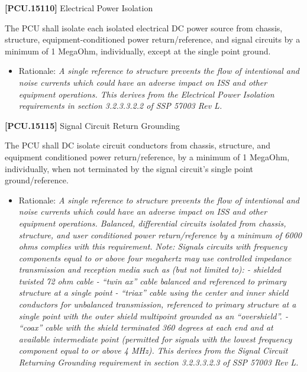 \documentclass[12pt,oneside,oldfontcommands]{memoir}
\begin{document}
\textbf{[PCU.15110]} Electrical Power Isolation

The \gls{PCU} shall isolate each isolated electrical DC power source from chassis, structure, equipment-conditioned power return\slash reference, and signal circuits by a minimum of 1 MegaOhm, individually, except at the single point ground.

\begin{itemize}
\item{} Rationale: \emph{A single reference to structure prevents the flow of intentional and noise currents which could have an adverse impact on ISS and other equipment operations. This derives from the Electrical Power Isolation requirements in section 3.2.3.3.2.2 of SSP 57003 Rev L.}

\end{itemize}

\textbf{[PCU.15115]} Signal Circuit Return Grounding

The \gls{PCU} shall DC isolate circuit conductors from chassis, structure, and equipment conditioned power return\slash reference, by a minimum of 1 MegaOhm, individually, when not terminated by the signal circuit's single point ground\slash reference.

\begin{itemize}
\item{} Rationale: \emph{A single reference to structure prevents the flow of intentional and noise currents which could have an adverse impact on ISS and other equipment operations. Balanced, differential circuits isolated from chassis, structure, and user conditioned power return\slash reference by a minimum of 6000 ohms complies with this requirement. Note: Signals circuits with frequency components equal to or above four megahertz may use controlled impedance transmission and reception media such as (but not limited to): - shielded twisted 72 ohm cable - ``twin ax'' cable balanced and referenced to primary structure at a single point - ``triax'' cable using the center and inner shield conductors for unbalanced transmission, referenced to primary structure at a single point with the outer shield multipoint grounded as an ``overshield''. - ``coax'' cable with the shield terminated 360 degrees at each end and at available intermediate point (permitted for signals with the lowest frequency component equal to or above 4 MHz). This derives from the Signal Circuit Returning Grounding requirement in section 3.2.3.3.2.3 of SSP 57003 Rev L.}

\end{itemize}
\end{document}

